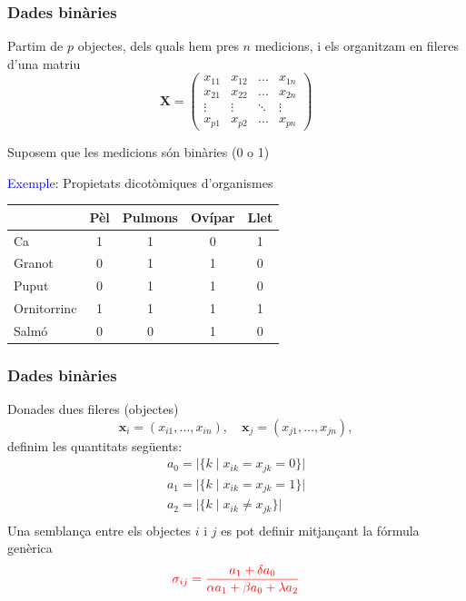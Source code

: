 \documentclass[12pt,t]{beamer}
\newcommand{\red}[1]{\textcolor{red}{#1}}
\newcommand{\blue}[1]{\textcolor{blue}{#1}}
\renewcommand{\emph}[1]{{\color{red}#1}}
\theoremstyle{plain}
\theoremstyle{definition}
\begin{document}
\begin{frame}
\frametitle{Dades binàries}
Partim de $p$ objectes, dels quals hem pres $n$ medicions, i els organitzam en fileres d'una matriu
$$
\mathbf{X}=
\begin{pmatrix}
x_{11}&x_{12}&\ldots&x_{1n} \\ 
x_{21}&x_{22}&\ldots&x_{2n} \\
\vdots&\vdots&\ddots&\vdots \\
x_{p1}&x_{p2}&\ldots&x_{pn}
\end{pmatrix}
$$

Suposem que les medicions són \emph{binàries} (0 o 1)\medskip

\blue{Exemple}:  Propietats dicotòmiques  d'organismes
\begin{center}
  \begin{tabular}{l|cccc}
& Pèl & Pulmons & Ovípar & Llet \\
\hline
Ca & 1 & 1 & 0 & 1\\
Granot & 0 & 1 & 1 & 0\\
Puput & 0 & 1 & 1 &0\\
Ornitorrinc & 1 & 1 & 1 & 1\\
Salmó & 0 & 0 & 1 & 0\\
\end{tabular}
\end{center}

\end{frame}

\begin{frame}
\frametitle{Dades binàries}
Donades dues fileres (objectes)
$$
\mathbf{x}_i=(x_{i1},\ldots,x_{in}),\quad \mathbf{x}_j=(x_{j1},\ldots,x_{jn}),
$$
definim les quantitats següents:
$$
\begin{array}{l}
a_0 = \big|\{k\mid x_{ik}=x_{jk}=0\}\big|\\[1ex]
a_1 =\big|\{k\mid x_{ik}=x_{jk}=1\}\big| \\[1ex]
a_2 = \big|\{k\mid x_{ik}\neq x_{jk}\}\big| \\[1ex]
\end{array}
$$
Una semblança entre els objectes $i$ i $j$ es pot definir mitjançant la fórmula genèrica
$$
\red{\sigma_{ij}=\frac{a_1 + \delta a_0}{\alpha a_1 + \beta a_0 +\lambda a_2}}
$$
\end{frame}
\end{document}
